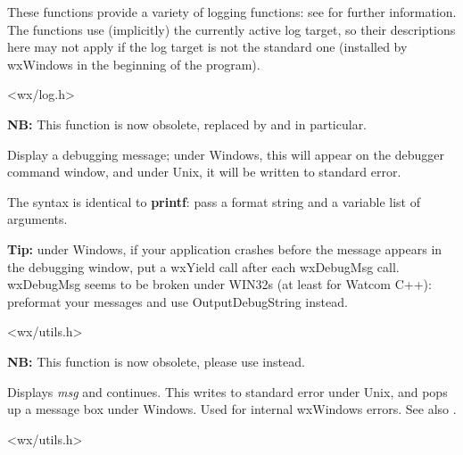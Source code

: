 These functions provide a variety of logging functions: see  for
further information. The functions use (implicitly) the currently active log
target, so their descriptions here may not apply if the log target is not the
standard one (installed by wxWindows in the beginning of the program).


<wx/log.h>

\label{wxdebugmsg}


{\bf NB:} This function is now obsolete, replaced by  and  in particular.

Display a debugging message; under Windows, this will appear on the
debugger command window, and under Unix, it will be written to standard
error.

The syntax is identical to {\bf printf}: pass a format string and a
variable list of arguments.

{\bf Tip:} under Windows, if your application crashes before the
message appears in the debugging window, put a wxYield call after
each wxDebugMsg call. wxDebugMsg seems to be broken under WIN32s
(at least for Watcom C++): preformat your messages and use OutputDebugString
instead.


<wx/utils.h>

\label{wxerror}


{\bf NB:} This function is now obsolete, please use  
instead.

Displays {\it msg} and continues. This writes to standard error under
Unix, and pops up a message box under Windows. Used for internal
wxWindows errors. See also .


<wx/utils.h>

\label{wxfatalerror}


